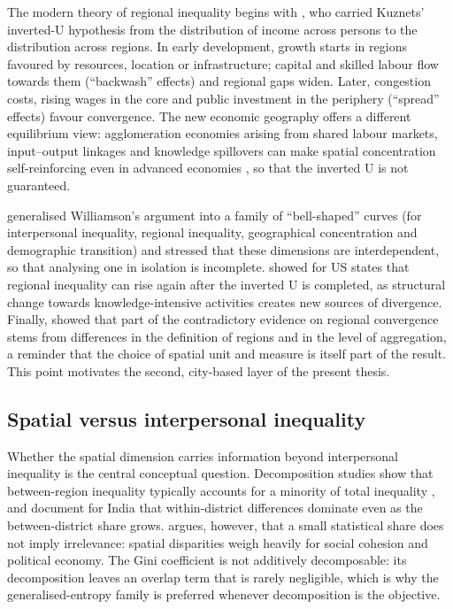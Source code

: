 \documentclass[11pt,a4paper]{article}
\begin{document}
The modern theory of regional inequality begins with \citet{Williamson1965}, who carried Kuznets' \citeyearpar{Kuznets1955} inverted-U hypothesis from the distribution of income across persons to the distribution across regions. In early development, growth starts in regions favoured by resources, location or infrastructure; capital and skilled labour flow towards them (``backwash'' effects) and regional gaps widen. Later, congestion costs, rising wages in the core and public investment in the periphery (``spread'' effects) favour convergence. The new economic geography offers a different equilibrium view: agglomeration economies arising from shared labour markets, input--output linkages and knowledge spillovers can make spatial concentration self-reinforcing even in advanced economies \citep{Krugman1991}, so that the inverted U is not guaranteed.

\citet{Alonso1980} generalised Williamson's argument into a family of ``bell-shaped'' curves (for interpersonal inequality, regional inequality, geographical concentration and demographic transition) and stressed that these dimensions are interdependent, so that analysing one in isolation is incomplete. \citet{Amos1988} showed for US states that regional inequality can rise again after the inverted U is completed, as structural change towards knowledge-intensive activities creates new sources of divergence. Finally, \citet{Magrini2004} showed that part of the contradictory evidence on regional convergence stems from differences in the definition of regions and in the level of aggregation, a reminder that the choice of spatial unit and measure is itself part of the result. This point motivates the second, city-based layer of the present thesis.

\subsection{Spatial versus interpersonal inequality}

Whether the spatial dimension carries information beyond interpersonal inequality is the central conceptual question. Decomposition studies show that between-region inequality typically accounts for a minority of total inequality \citep{Shorrocks2005,Novotny2007}, and \citet{AzamBhatt2018} document for India that within-district differences dominate even as the between-district share grows. \citet{Novotny2007} argues, however, that a small statistical share does not imply irrelevance: spatial disparities weigh heavily for social cohesion and political economy. The Gini coefficient is not additively decomposable: its decomposition leaves an overlap term that is rarely negligible, which is why the generalised-entropy family is preferred whenever decomposition is the objective.
\end{document}
